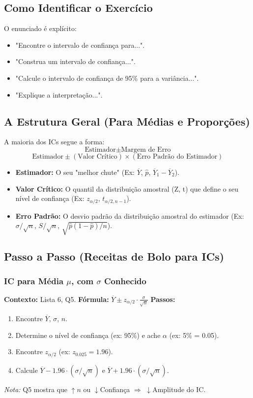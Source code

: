 \subsection{Como Identificar o Exercício}
O enunciado é explícito:
\begin{itemize}
    \item "Encontre o intervalo de confiança para...".
    \item "Construa um intervalo de confiança...".
    \item "Calcule o intervalo de confiança de 95\% para a variância...".
    \item "Explique a interpretação...".
\end{itemize}

\subsection{A Estrutura Geral (Para Médias e Proporções)}
A maioria dos ICs segue a forma:
$$ \text{Estimador} \pm \text{Margem de Erro} $$
$$ \text{Estimador} \pm (\text{Valor Crítico}) \times (\text{Erro Padrão do Estimador}) $$
\begin{itemize}
    \item \textbf{Estimador:} O seu "melhor chute" (Ex: $\overline{Y}$, $\hat{p}$, $\overline{Y}_1 - \overline{Y}_2$).
    \item \textbf{Valor Crítico:} O quantil da distribuição amostral (Z, t) que define o seu nível de confiança (Ex: $z_{\alpha/2}$, $t_{\alpha/2, n-1}$).
    \item \textbf{Erro Padrão:} O desvio padrão da distribuição amostral do estimador (Ex: $\sigma/\sqrt{n}$, $S/\sqrt{n}$, $\sqrt{\hat{p}(1-\hat{p})/n}$).
\end{itemize}

\subsection{Passo a Passo (Receitas de Bolo para ICs)}

\subsubsection{IC para Média $\mu$, com $\sigma$ Conhecido}
\textbf{Contexto:} Lista 6, Q5.
\textbf{Fórmula:} $\overline{Y} \pm z_{\alpha/2} \cdot \frac{\sigma}{\sqrt{n}}$
\textbf{Passos:}
\begin{enumerate}
    \item Encontre $\overline{Y}$, $\sigma$, $n$.
    \item Determine o nível de confiança (ex: 95\%) e ache $\alpha$ (ex: 5\% = 0.05).
    \item Encontre $z_{\alpha/2}$ (ex: $z_{0.025} = 1.96$).
    \item Calcule $\overline{Y} - 1.96 \cdot (\sigma/\sqrt{n})$ e $\overline{Y} + 1.96 \cdot (\sigma/\sqrt{n})$.
\end{enumerate}
\textit{Nota:} Q5 mostra que $\uparrow n$ ou $\downarrow$Confiança $\Rightarrow$ $\downarrow$Amplitude do IC.

